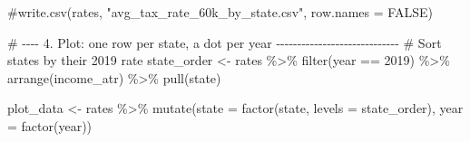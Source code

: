 \documentclass[
  letterpaper,
  DIV=11,
  numbers=noendperiod]{scrartcl}
\newenvironment{Shaded}{\begin{snugshade}}{\end{snugshade}}
\newcommand{\AttributeTok}[1]{\textcolor[rgb]{0.40,0.45,0.13}{#1}}
\newcommand{\CommentTok}[1]{\textcolor[rgb]{0.37,0.37,0.37}{#1}}
\newcommand{\DecValTok}[1]{\textcolor[rgb]{0.68,0.00,0.00}{#1}}
\newcommand{\FunctionTok}[1]{\textcolor[rgb]{0.28,0.35,0.67}{#1}}
\newcommand{\NormalTok}[1]{\textcolor[rgb]{0.00,0.23,0.31}{#1}}
\newcommand{\OtherTok}[1]{\textcolor[rgb]{0.00,0.23,0.31}{#1}}
\newcommand{\SpecialCharTok}[1]{\textcolor[rgb]{0.37,0.37,0.37}{#1}}
\begin{document}
\begin{Shaded}
\begin{Highlighting}[]
\CommentTok{\#write.csv(rates, "avg\_tax\_rate\_60k\_by\_state.csv", row.names = FALSE)}

\CommentTok{\# {-}{-}{-}{-} 4. Plot: one row per state, a dot per year {-}{-}{-}{-}{-}{-}{-}{-}{-}{-}{-}{-}{-}{-}{-}{-}{-}{-}{-}{-}{-}{-}{-}{-}{-}{-}{-}{-}{-}}
\CommentTok{\# Sort states by their 2019 rate}
\NormalTok{state\_order }\OtherTok{\textless{}{-}}\NormalTok{ rates }\SpecialCharTok{\%\textgreater{}\%}
  \FunctionTok{filter}\NormalTok{(year }\SpecialCharTok{==} \DecValTok{2019}\NormalTok{) }\SpecialCharTok{\%\textgreater{}\%}
  \FunctionTok{arrange}\NormalTok{(income\_atr) }\SpecialCharTok{\%\textgreater{}\%}
  \FunctionTok{pull}\NormalTok{(state)}

\NormalTok{plot\_data }\OtherTok{\textless{}{-}}\NormalTok{ rates }\SpecialCharTok{\%\textgreater{}\%}
  \FunctionTok{mutate}\NormalTok{(}\AttributeTok{state =} \FunctionTok{factor}\NormalTok{(state, }\AttributeTok{levels =}\NormalTok{ state\_order),}
         \AttributeTok{year  =} \FunctionTok{factor}\NormalTok{(year))}


\end{Highlighting}
\end{Shaded}
\end{document}
